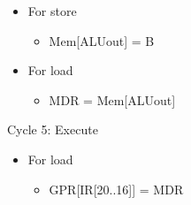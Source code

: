 \begin{definition}
\begin{itemize}
        \item For store
              \begin{itemize}
                  \item Mem[ALUout] = B
              \end{itemize}
        \item For load
              \begin{itemize}
                  \item MDR = Mem[ALUout]
              \end{itemize}
    \end{itemize}
    \item [Cycle 5: Execute]
    \begin{itemize}
        \item For load
              \begin{itemize}
                  \item GPR[IR[20..16]] = MDR
              \end{itemize}
    \end{itemize}
\end{definition}
